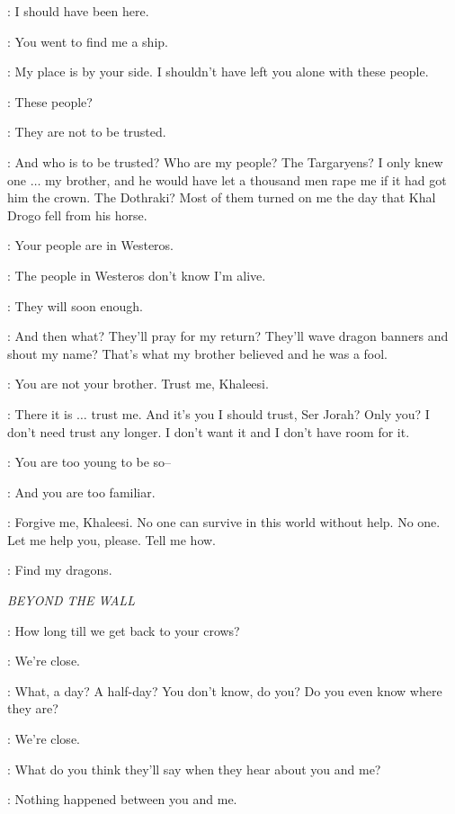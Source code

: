 \JORAH: I should have been here.

\DAENERYS: You went to find me a ship.

\JORAH: My place is by your side. I shouldn't have left you alone with these people.

\DAENERYS: These people?

\JORAH: They are not to be trusted.

\DAENERYS: And who is to be trusted? Who are my people? The Targaryens? I only knew one $\ldots$ my brother, and he would have let a thousand men rape me if it had got him the crown. The Dothraki? Most of them turned on me the day that Khal Drogo fell from his horse.

\JORAH: Your people are in Westeros.

\DAENERYS: The people in Westeros don't know I'm alive.

\JORAH: They will soon enough.

\DAENERYS: And then what? They'll pray for my return? They'll wave dragon banners and shout my name? That's what my brother believed and he was a fool.

\JORAH: You are not your brother. Trust me, Khaleesi.

\DAENERYS: There it is $\ldots$ trust me. And it's you I should trust, Ser Jorah? Only you? I don't need trust any longer. I don't want it and I don't have room for it.

\JORAH:  You are too young to be so--

\DAENERYS: And you are too familiar.

\JORAH: Forgive me, Khaleesi. No one can survive in this world without help. No one. Let me help you, please. Tell me how.

\DAENERYS: Find my dragons.


\scene

\textit{BEYOND THE WALL}


\YGRITTE: How long till we get back to your crows?

\JON: We're close.

\YGRITTE: What, a day? A half-day? You don't know, do you? Do you even know where they are?

\JON: We're close.

\YGRITTE: What do you think they'll say when they hear about you and me?

\JON: Nothing happened between you and me.

